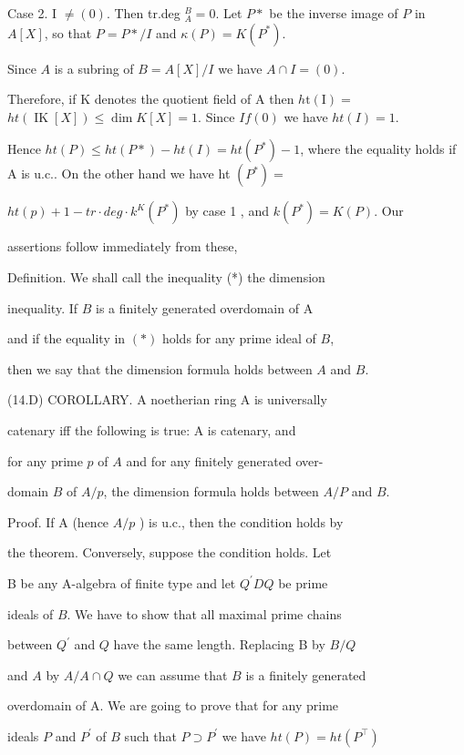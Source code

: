 Case 2. I $\neq(0)$. Then tr.deg ${ }_{A}^{B}=0$. Let $P *$ be the inverse image of $P$ in $A[X]$, so that $P=P * / I$ and $\kappa(P)=K\left(P^{*}\right)$.

Since $A$ is a subring of $B=A[X] / I$ we have $A \cap I=(0)$.

Therefore, if $\mathrm{K}$ denotes the quotient field of $\mathrm{A}$ then $h \mathrm{t}(\mathrm{I})=$ $h t(\operatorname{IK}[X]) \leqslant \operatorname{dim} K[X]=1$. Since $I f(0)$ we have $h t(I)=1$.

Hence $h t(P) \leqslant h t(P *)-h t(I)=h t\left(P^{*}\right)-1$, where the equality holds if A is u.c.. On the other hand we have ht $\left(P^{*}\right)=$

$h t(p)+1-t r \cdot d e g \cdot k^{K}\left(P^{*}\right)$ by case 1 , and $k\left(P^{*}\right)=K(P)$. Our

assertions follow immediately from these,

Definition. We shall call the inequality (*) the dimension

inequality. If $B$ is a finitely generated overdomain of A

and if the equality in $(*)$ holds for any prime ideal of $B$,

then we say that the dimension formula holds between $A$ and $B$.

(14.D) COROLLARY. A noetherian ring A is universally

catenary iff the following is true: A is catenary, and

for any prime $p$ of $A$ and for any finitely generated over-

domain $B$ of $A / p$, the dimension formula holds between $A / P$ and $B$.

Proof. If A (hence $A / p$ ) is u.c., then the condition holds by

the theorem. Conversely, suppose the condition holds. Let

B be any A-algebra of finite type and let $Q^{\prime} D Q$ be prime

ideals of $B$. We have to show that all maximal prime chains

between $Q^{\prime}$ and $Q$ have the same length. Replacing B by $B / Q$

and $A$ by $A / A \cap Q$ we can assume that $B$ is a finitely generated

overdomain of A. We are going to prove that for any prime

ideals $P$ and $P^{\prime}$ of $B$ such that $P \supset P^{\prime}$ we have $h t(P)=h t\left(P^{\top}\right)$

